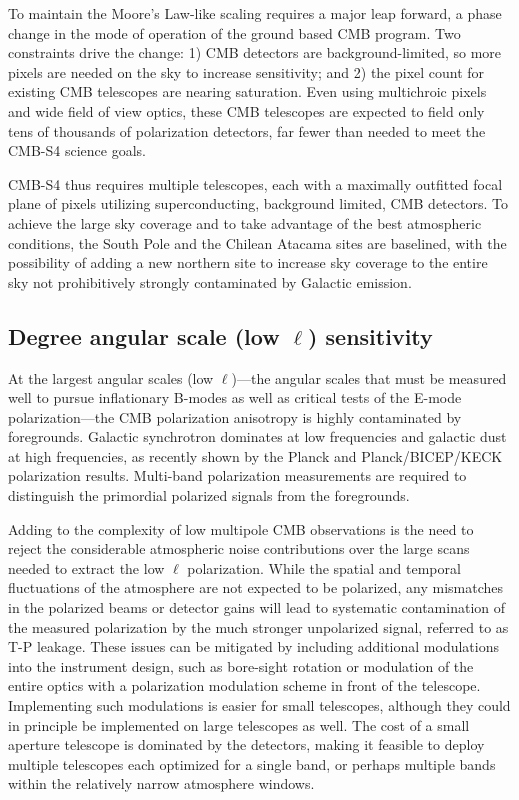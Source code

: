 To maintain the Moore's Law-like scaling requires a major leap forward, a phase change in the mode of operation of the ground based CMB program.  Two constraints drive the change:  1) CMB detectors are background-limited, so more pixels are needed on the sky to increase sensitivity; and 2) the pixel count for existing CMB telescopes are nearing saturation.  Even using multichroic pixels and wide field of view optics, these CMB telescopes are expected to field only tens of thousands of polarization detectors, far fewer than needed to meet the CMB-S4 science goals. 

CMB-S4 thus requires multiple telescopes, each with a maximally outfitted focal plane of pixels utilizing superconducting, background limited, CMB detectors. To achieve the large sky coverage and to take advantage of the best atmospheric conditions, the South Pole and the Chilean Atacama sites are baselined, with the possibility of adding a new northern site to increase sky coverage to the entire sky not prohibitively strongly contaminated by Galactic emission.

\subsection{Degree angular scale (low $\ell$) sensitivity}

At the largest angular scales (low $\ell$)---the angular scales that must be measured well to pursue inflationary B-modes as well as critical tests of the E-mode polarization---the CMB polarization anisotropy is highly contaminated by foregrounds. Galactic synchrotron dominates at low frequencies and galactic dust at high frequencies, as recently shown by the Planck and Planck/BICEP/KECK polarization results. Multi-band polarization measurements are required to distinguish the primordial polarized signals from the foregrounds. 

Adding to the complexity of low multipole CMB observations is the need to reject the considerable atmospheric noise contributions over the large scans needed to extract the low 
$\ell$ polarization. While the spatial and temporal fluctuations of the atmosphere are not expected to be polarized, any mismatches in the polarized beams or detector gains will lead to systematic contamination of the measured polarization by the much stronger unpolarized signal, referred to as T-P leakage. These issues can be mitigated by including additional modulations into the instrument design, such as bore-sight rotation or modulation of the entire optics with a polarization modulation scheme in front of the telescope. Implementing such modulations is easier for small telescopes, although they could in principle be implemented on large telescopes as well. The cost of a small aperture telescope is dominated by the detectors, making it feasible to deploy multiple telescopes each optimized for a single band, or perhaps multiple bands within the relatively narrow atmosphere windows.

